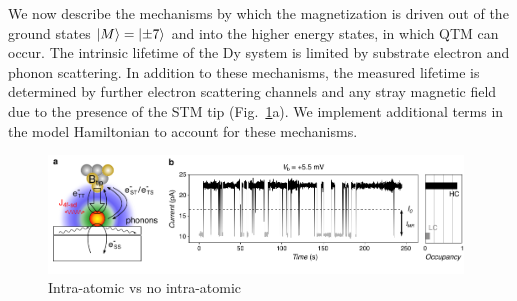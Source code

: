 \documentclass[
reprint,amsmath,amssymb,aps]{revtex4-2}
\begin{document}
We now describe the mechanisms by which the magnetization is driven out of the ground states $\ket{M}=\ket{\pm7}$ and into the higher energy states, in which QTM can occur. The intrinsic lifetime of the Dy system is limited by substrate electron and phonon scattering. In addition to these mechanisms, the measured lifetime is determined by further electron scattering channels and any stray magnetic field due to the presence of the STM tip (Fig.~\ref{fig:no_tip_tip_telegraph}a). We implement additional terms in the model Hamiltonian to account for these mechanisms. 

\begin{figure}[ht!]
\includegraphics[width=0.98\textwidth]{Fig2_new.pdf}
\caption{Intra-atomic vs no intra-atomic
\label{fig:no_tip_tip_telegraph} }
\end{figure}
\end{document}
